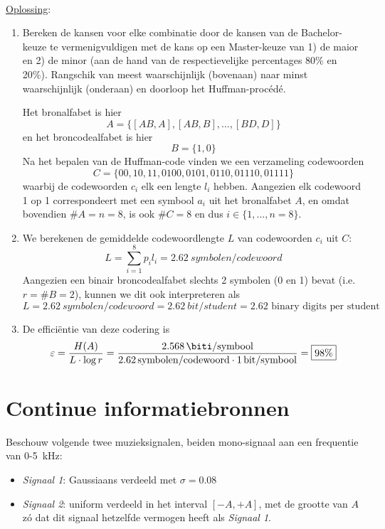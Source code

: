 \documentclass[kulak]{kulakarticle}
\let\epsilon\varepsilon
\begin{document}
	\hfill \\
	\underline{Oplossing}:
	\begin{enumerate}
		\item Bereken de kansen voor elke combinatie door de kansen van de Bachelor-keuze te vermenigvuldigen met de kans op een Master-keuze van 1) de maior en 2) de minor (aan de hand van de respectievelijke percentages 80\% en 20\%). Rangschik van meest waarschijnlijk (bovenaan) naar minst waarschijnlijk (onderaan) en doorloop het Huffman-procédé.

		Het bronalfabet is hier \[A=\{[AB,A],[AB,B],...,[BD,D]\}\] en het broncodealfabet is hier \[ B=\{1,0\} \] Na het bepalen van de Huffman-code vinden we een verzameling codewoorden \[ \boxed{C=\{00,10,11,0100,0101,0110,01110,01111\}} \] waarbij de codewoorden \(c_i\) elk een lengte \(l_i\) hebben. Aangezien elk codewoord 1 op 1 correspondeert met een symbool \(a_i\) uit het bronalfabet \(A\), en omdat bovendien \(\#A=n=8\), is ook \(\#C=8\) en dus \(i \in \{1,...,n=8\}\).

		\item We berekenen de gemiddelde codewoordlengte \(L\) van codewoorden \(c_i\) uit \(C\): \[ L=\sum_{i=1}^{8}p_il_i = \boxed{\SI{2.62}{symbolen/codewoord}} \]Aangezien een binair broncodealfabet slechts 2 symbolen (0 en 1) bevat (i.e. \(r=\#B=2\)), kunnen we dit ook interpreteren als \[L=\SI{2.62}{symbolen/codewoord}=\SI{2.62}{bit\per student}=2.62 \text{ binary digits per student} \]

		\item De efficiëntie van deze codering is \[\epsilon = \frac{H(A)}{L\cdot \log{r}}
		= \frac{\SI{2.568}{\biti \per symbool}}{\SI{2.62}{symbolen \per codewoord}\cdot \SI{1}{bit \per symbool}} = \boxed{98\%} \]
	\end{enumerate}

	\newpage

	\section{Continue informatiebronnen}

	Beschouw volgende twee muzieksignalen, beiden mono-signaal aan een frequentie van 0-\SI{5}{\kilo \hertz}:
	\begin{itemize}
		\item \textit{Signaal 1}: Gaussiaans verdeeld met \( \sigma=0.08 \)
		\item \textit{Signaal 2}: uniform verdeeld in het interval \( [-A,+A] \), met de grootte van \( A \) zó dat dit signaal hetzelfde vermogen heeft als \textit{Signaal 1}.
	\end{itemize}
\end{document}
